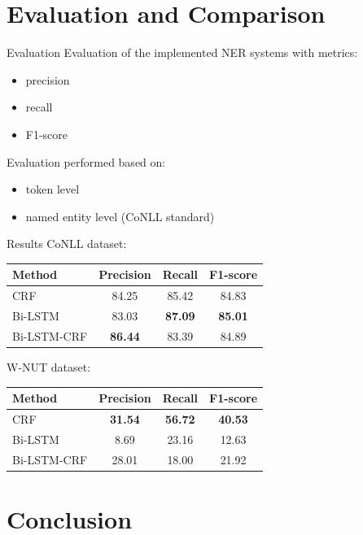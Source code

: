 \documentclass[12pt, tikz]{beamer}
\begin{document}
\section{Evaluation and Comparison}

\begin{frame}[fragile]{Evaluation}
	Evaluation of the implemented NER systems with metrics:
	\begin{itemize}
		\item precision
		\item recall
		\item F1-score
	\end{itemize}

	\pause
	
	Evaluation performed based on:
	\begin{itemize}
		\item token level
		\item named entity level (CoNLL standard)
	\end{itemize}
\end{frame}

\begin{frame}[fragile]{Results}
	CoNLL dataset:
	\begin{center}
		\begin{tabular}{| l | c | c | c |}
			\hline
			Method & Precision & Recall & F1-score \\ \hline
			CRF & 84.25 & 85.42 & 84.83 \\ \hline
			Bi-LSTM & 83.03 & \textbf{87.09} & \textbf{85.01} \\ \hline
			Bi-LSTM-CRF & \textbf{86.44} & 83.39 & 84.89 \\ \hline
		\end{tabular}
	\end{center}

	W-NUT dataset:
	\begin{center}
	\begin{tabular}{| l | c | c | c |}
		\hline
		Method & Precision & Recall & F1-score \\ \hline
		CRF & \textbf{31.54} & \textbf{56.72} & \textbf{40.53} \\ \hline
		Bi-LSTM & 8.69 & 23.16 & 12.63 \\ \hline
		Bi-LSTM-CRF & 28.01 & 18.00 & 21.92 \\ \hline
	\end{tabular}
\end{center}

\end{frame}


\section{Conclusion}


\end{document}
